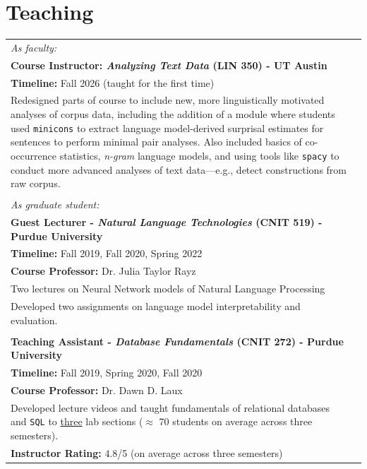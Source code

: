\documentclass[11pt]{article}
\begin{document}
\renewcommand*{\arraystretch}{1}
\section*{Teaching}
\begin{tabularx}{\textwidth}{@{}p{}l}
\textit{As faculty:}\\
\textbf{Course Instructor: \textit{Analyzing Text Data} (LIN 350) - UT Austin}\\
\textbf{Timeline:} Fall 2026 (taught for the first time)\\
Redesigned parts of course to include new, more linguistically motivated analyses of corpus data, including the addition of a module where students used \texttt{minicons} to extract language model-derived surprisal estimates for sentences to perform minimal pair analyses. Also included basics of co-occurrence statistics, \textit{n-gram} language models, and using tools like \texttt{spacy} to conduct more advanced analyses of text data---e.g., detect constructions from raw corpus.
\\\\


\textit{As graduate student:}\\
\textbf{Guest Lecturer - \textit{Natural Language Technologies} (CNIT 519) - Purdue University}\\
\textbf{Timeline:} Fall 2019, Fall 2020, Spring 2022\\
\textbf{Course Professor:} Dr. Julia Taylor Rayz\\
Two lectures on Neural Network models of Natural Language Processing\\
Developed two assignments on language model interpretability and evaluation.\\\\
\textbf{Teaching Assistant - \textit{Database Fundamentals} (CNIT 272) - Purdue University}\\
\textbf{Timeline:} Fall 2019, Spring 2020, Fall 2020\\
\textbf{Course Professor:} Dr. Dawn D. Laux\\
Developed lecture videos and taught fundamentals of relational databases and \texttt{SQL} to \underline{three} lab sections ($\approx$ 70 students on average across three semesters).\\
\textbf{Instructor Rating:} 4.8/5 (on average across three semesters)
\end{tabularx}
\end{document}

